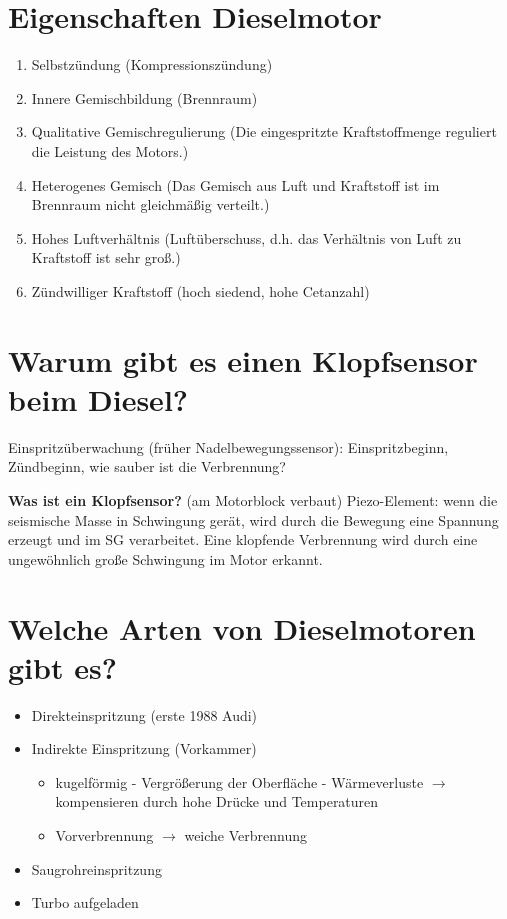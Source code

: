 \section{Eigenschaften Dieselmotor}\label{eigenschaften-dieselmotor}

\begin{enumerate}
\item
  Selbstzündung (Kompressionszündung)
\item
  Innere Gemischbildung (Brennraum)
\item
  Qualitative Gemischregulierung (Die eingespritzte Kraftstoffmenge
  reguliert die Leistung des Motors.)
\item
  Heterogenes Gemisch (Das Gemisch aus Luft und Kraftstoff ist im
  Brennraum nicht gleichmäßig verteilt.)
\item
  Hohes Luftverhältnis (Luftüberschuss, d.h. das Verhältnis von Luft zu
  Kraftstoff ist sehr groß.)
\item
  Zündwilliger Kraftstoff (hoch siedend, hohe Cetanzahl)
\end{enumerate}

\section{Warum gibt es einen Klopfsensor beim
Diesel?}\label{warum-gibt-es-einen-klopfsensor-beim-diesel}

Einspritzüberwachung (früher Nadelbewegungssensor): Einspritzbeginn,
Zündbeginn, wie sauber ist die Verbrennung?

\textbf{Was ist ein Klopfsensor?} (am Motorblock verbaut) Piezo-Element:
wenn die seismische Masse in Schwingung gerät, wird durch die Bewegung
eine Spannung erzeugt und im SG verarbeitet. Eine klopfende Verbrennung
wird durch eine ungewöhnlich große Schwingung im Motor erkannt.

\section{Welche Arten von Dieselmotoren gibt
es?}\label{welche-arten-von-dieselmotoren-gibt-es}

\begin{itemize}
\item
  Direkteinspritzung (erste 1988 Audi)
\item
  Indirekte Einspritzung (Vorkammer)

  \begin{itemize}
  \item
    kugelförmig - Vergrößerung der Oberfläche - Wärmeverluste $\to$
    kompensieren durch hohe Drücke und Temperaturen
  \item
    Vorverbrennung $\to$ weiche Verbrennung
  \end{itemize}
\item
  Saugrohreinspritzung
\item
  Turbo aufgeladen
\end{itemize}

